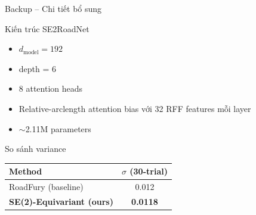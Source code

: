 \documentclass[aspectratio=169,10pt]{beamer}
\begin{document}
\appendix

\begin{frame}{Backup -- Chi tiết bổ sung}
\begin{block}{Kiến trúc SE2RoadNet}
\scriptsize
\begin{itemize}
  \item $d_{\text{model}} = 192$
  \item depth = 6
  \item 8 attention heads
  \item Relative-arclength attention bias với 32 RFF features mỗi layer
  \item $\sim$2.11M parameters
\end{itemize}
\end{block}

\begin{block}{So sánh variance}
\scriptsize
\begin{tabular}{l c}
  \toprule
  \textbf{Method} & $\sigma$ (30-trial) \\
  \midrule
  RoadFury (baseline) & 0.012 \\
  \textbf{SE(2)-Equivariant (ours)} & \textbf{0.0118} \\
  \bottomrule
\end{tabular}
\end{block}
\end{frame}
\end{document}
